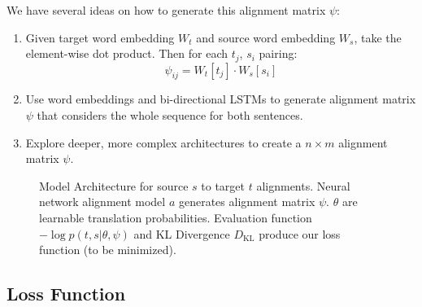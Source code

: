 \documentclass[twoside,twocolumn]{article}
\begin{document}
We have several ideas on how to generate this alignment matrix $\psi$:
\begin{enumerate}
  \item Given target word embedding $W_t$ and source word embedding $W_s$,
  take the element-wise dot product. Then for each $t_j$, $s_i$ pairing:
  \begin{equation}
    \psi_{ij} = W_t[t_j] \cdot W_s[s_i]
  \end{equation}
  \item Use word embeddings and bi-directional LSTMs to generate alignment
    matrix $\psi$ that considers the whole sequence for both sentences.
  \item Explore deeper, more complex architectures to create a $n \times m$
    alignment matrix $\psi$.
\end{enumerate}

\begin{figure}
\centering
{}
\caption{Model Architecture for source $s$ to target $t$ alignments. Neural
network alignment model $a$ generates alignment matrix $\psi$. $\theta$ are
learnable translation probabilities. Evaluation function
$- \log p(t, s | \theta, \psi)$ and KL Divergence $D_{\mathrm{KL}}$ produce our
loss function (to be minimized).}
\end{figure}


\subsection{Loss Function}
\end{document}
